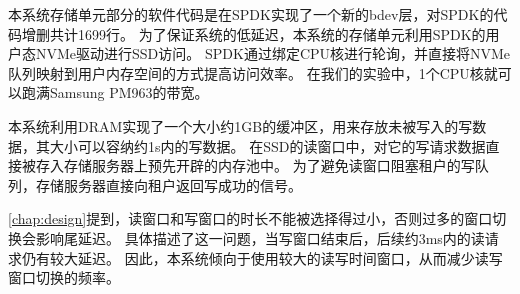 本系统存储单元部分的软件代码是在SPDK实现了一个新的bdev层，对SPDK的代码增删共计1699行。
为了保证系统的低延迟，本系统的存储单元利用SPDK的用户态NVMe驱动进行SSD访问。
SPDK通过绑定CPU核进行轮询，并直接将NVMe队列映射到用户内存空间的方式提高访问效率。
在我们的实验中，1个CPU核就可以跑满Samsung PM963的带宽。

本系统利用DRAM实现了一个大小约1GB的缓冲区，用来存放未被写入的写数据，其大小可以容纳约1s内的写数据。
在SSD的读窗口中，对它的写请求数据直接被存入存储服务器上预先开辟的内存池中。
为了避免读窗口阻塞租户的写队列，存储服务器直接向租户返回写成功的信号。


\autoref{chap:design}提到，读窗口和写窗口的时长不能被选择得过小，否则过多的窗口切换会影响尾延迟。
具体描述了这一问题，当写窗口结束后，后续约3ms内的读请求仍有较大延迟。
因此，本系统倾向于使用较大的读写时间窗口，从而减少读写窗口切换的频率。
